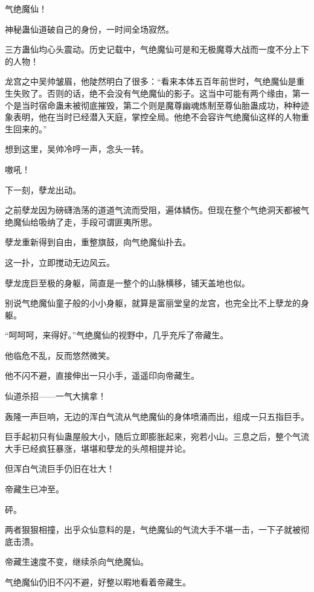 
\begin{this_body}

气绝魔仙！

神秘蛊仙道破自己的身份，一时间全场寂然。

三方蛊仙均心头震动。历史记载中，气绝魔仙可是和无极魔尊大战而一度不分上下的人物！

龙宫之中吴帅皱眉，他陡然明白了很多：“看来本体五百年前世时，气绝魔仙是重生失败了。否则的话，绝不会没有气绝魔仙的影子。这当中可能有两个缘由，第一个是当时宿命蛊未被彻底摧毁，第二个则是魔尊幽魂炼制至尊仙胎蛊成功，种种迹象表明，他在当时已经潜入天庭，掌控全局。他绝不会容许气绝魔仙这样的人物重生回来的。”

想到这里，吴帅冷哼一声，念头一转。

嗷吼！

下一刻，孽龙出动。

之前孽龙因为磅礴浩荡的道道气流而受阻，遍体鳞伤。但现在整个气绝洞天都被气绝魔仙给吸纳了走，手段可谓匪夷所思。

孽龙重新得到自由，重整旗鼓，向气绝魔仙扑去。

这一扑，立即搅动无边风云。

孽龙庞巨至极的身躯，简直是一整个的山脉横移，铺天盖地也似。

别说气绝魔仙童子般的小小身躯，就算是富丽堂皇的龙宫，也完全比不上孽龙的身躯。

“呵呵呵，来得好。”气绝魔仙的视野中，几乎充斥了帝藏生。

他临危不乱，反而悠然微笑。

他不闪不避，直接伸出一只小手，遥遥印向帝藏生。

仙道杀招——一气大擒拿！

轰隆一声巨响，无边的浑白气流从气绝魔仙的身体喷涌而出，组成一只五指巨手。

巨手起初只有仙蛊屋般大小，随后立即膨胀起来，宛若小山。三息之后，整个气流大手已经疯狂暴涨，堪堪和孽龙的头颅相提并论。

但浑白气流巨手仍旧在壮大！

帝藏生已冲至。

砰。

两者狠狠相撞，出乎众仙意料的是，气绝魔仙的气流大手不堪一击，一下子就被彻底击溃。

帝藏生速度不变，继续杀向气绝魔仙。

气绝魔仙仍旧不闪不避，好整以暇地看着帝藏生。


\end{this_body}
